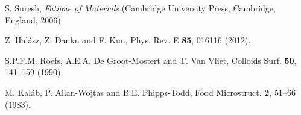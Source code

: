 \documentclass[twocolumn,superscriptaddress,showpacs,preprintnumbers,amsmath,amssymb,prl]{revtex4}
\begin{document}
\begin{thebibliography}{}
 S. Suresh, {\it Fatigue of Materials} (Cambridge University Press, Cambridge, England, 2006)

 Z. Hal\'asz, Z. Danku and F. Kun, Phys. Rev. E {\bf 85}, 016116 (2012).

 S.P.F.M. Roefs, A.E.A. De Groot-Mostert and T. Van Vliet, Colloids Surf. {\bf 50}, 141--159 (1990).

 M. Kal\'ab, P. Allan-Wojtas and B.E. Phipps-Todd, Food Microstruct. {\bf 2}, 51--66 (1983).
















\end{thebibliography}
\end{document}
